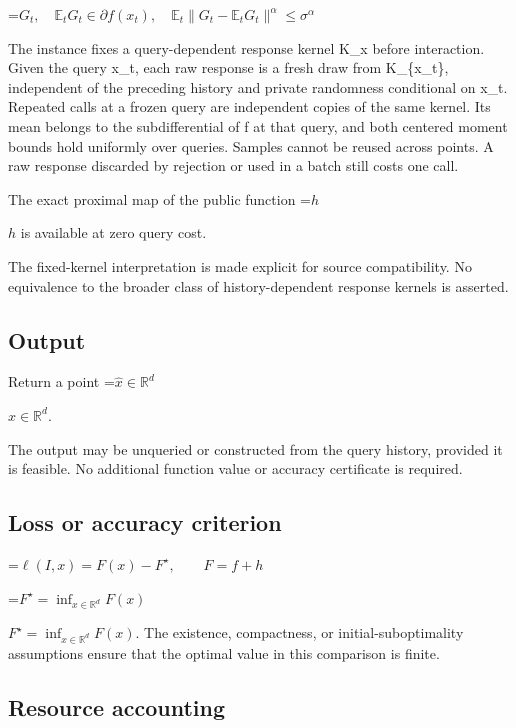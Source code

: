 \documentclass[10pt,a4paper]{article}
\newcommand{\AtlasMath}[1]{\par\begingroup\centering\setbox0=\hbox{$\displaystyle #1$}\ifdim\wd0>1.4\linewidth\typeout{ATLAS WIDE FORMULA: \the\wd0}\fi\ifdim\wd0>\linewidth\resizebox{\linewidth}{!}{\box0}\else\box0\fi\par\endgroup}
\newcommand{\AtlasInlineMath}[1]{\begingroup\setbox0=\hbox{$#1$}\ifdim\wd0>.4\linewidth\endgroup\AtlasMath{#1}\else\endgroup$#1$\fi}
\begin{document}
\AtlasMath{G_t,\quad \mathbb{E}_tG_t\in\partial f(x_t),\quad\mathbb{E}_t\|G_t-\mathbb{E}_tG_t\|^\alpha\le\sigma^\alpha}




The instance fixes a query-dependent response kernel K\_x before interaction. Given the query x\_t, each raw response is a fresh draw from K\_\{x\_t\}, independent of the preceding history and private randomness conditional on x\_t. Repeated calls at a frozen query are independent copies of the same kernel. Its mean belongs to the subdifferential of f at that query, and both centered moment bounds hold uniformly over queries. Samples cannot be reused across points. A raw response discarded by rejection or used in a batch still costs one call.



The exact proximal map of the public function \AtlasInlineMath{h} is available at zero query cost.



The fixed-kernel interpretation is made explicit for source compatibility. No equivalence to the broader class of history-dependent response kernels is asserted.



\subsection{Output}


Return a point \AtlasInlineMath{\widehat x\in\mathbb R^d}.



The output may be unqueried or constructed from the query history, provided it is feasible. No additional function value or accuracy certificate is required.



\subsection{Loss or accuracy criterion}



\AtlasMath{\ell(I,x)=F(x)-F^\star,\qquad F=f+h}




\AtlasInlineMath{F^\star=\inf_{x\in \mathbb{R}^d}F(x)}. The existence, compactness, or initial-suboptimality assumptions ensure that the optimal value in this comparison is finite.



\subsection{Resource accounting}
\end{document}
